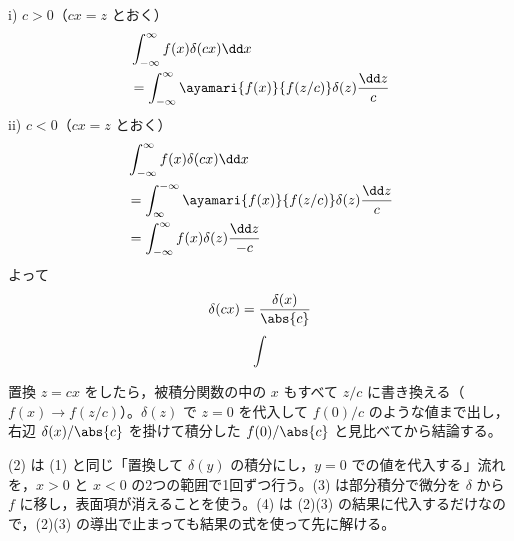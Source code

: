 i) $c>0$（$cx=z$ とおく）
\begin{align*}
&\int_{-\infty}^{\infty}f(x)\delta(cx)\dd x\\
&=\int_{-\infty}^{\infty}\ayamari{f(x)}{f(z/c)}\delta(z)\frac{\dd z}{c}
\end{align*}
ii) $c<0$（$cx=z$ とおく）
\begin{align*}
&\int_{-\infty}^{\infty}f(x)\delta(cx)\dd x\\
&=\int_{\infty}^{-\infty}\ayamari{f(x)}{f(z/c)}\delta(z)\frac{\dd z}{c}\\
&=\int_{-\infty}^{\infty}f(x)\delta(z)\frac{\dd z}{-c}
\end{align*}
よって
\[ \delta(cx)=\frac{\delta(x)}{\abs{c}} \]
\[ \int \]
\mikai
{}
\mikai
\item 置換 $z=cx$ をしたら，被積分関数の中の $x$ もすべて $z/c$ に書き換える（$f(x)\to f(z/c)$）。$\delta(z)$ で $z=0$ を代入して $f(0)/c$ のような値まで出し，右辺 $\delta(x)/\abs{c}$ を掛けて積分した $f(0)/\abs{c}$ と見比べてから結論する。
\item (2) は (1) と同じ「置換して $\delta(y)$ の積分にし，$y=0$ での値を代入する」流れを，$x>0$ と $x<0$ の2つの範囲で1回ずつ行う。(3) は部分積分で微分を $\delta$ から $f$ に移し，表面項が消えることを使う。(4) は (2)(3) の結果に代入するだけなので，(2)(3) の導出で止まっても結果の式を使って先に解ける。
